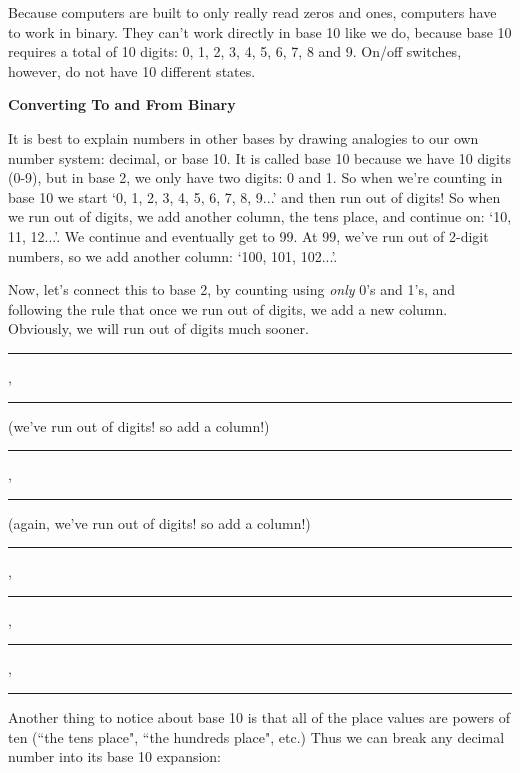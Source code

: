 \documentclass{article}
\begin{document}
\vspace{0.2in}

Because computers are built to only really read zeros and ones, computers have to work in binary. They can't work directly in base 10 like we do, because base 10 requires a total of 10 digits: 0, 1, 2, 3, 4, 5, 6, 7, 8 and 9. On/off switches, however, do not have 10 different states.


\vspace{0.5in}

\noindent\textbf{Converting To and From Binary}

\vspace{0.3in}

It is best to explain numbers in other bases by drawing analogies to our own number system: decimal, or base 10. It is called base 10 because we have 10 digits (0-9), but in base 2, we only have two digits: 0 and 1. So when we're counting in base 10 we start `0, 1, 2, 3, 4, 5, 6, 7, 8, 9...' and then run out of digits! So when we run out of digits, we add another column, the tens place, and continue on: `10, 11, 12...'.  We continue and eventually get to 99. At 99, we've run out of 2-digit numbers, so we add another column: `100, 101, 102...'.

\vspace{0.2in} 

Now, let's connect this to base 2, by counting using \textit{only} 0's and 1's, and following the rule that once we run out of digits, we add a new column. Obviously, we will run out of digits much sooner.

\vspace{0.3in}

\rule{1in}{.01in}, \rule{1in}{.01in}  (we've run out of digits! so add a column!)

\vspace{0.3in}

 \rule{1in}{.01in}, \rule{1in}{.01in} (again, we've run out of digits! so add a column!)
 
 \vspace{0.3in}
 
 \rule{1in}{.01in}, \rule{1in}{.01in},  \rule{1in}{.01in}, \rule{1in}{.01in}  \newline
 
 

\newpage 

Another thing to notice about base 10 is that all of the place values are powers of ten (``the tens place", ``the hundreds place", etc.) Thus we can break any decimal number into its base 10 expansion:
\end{document}
